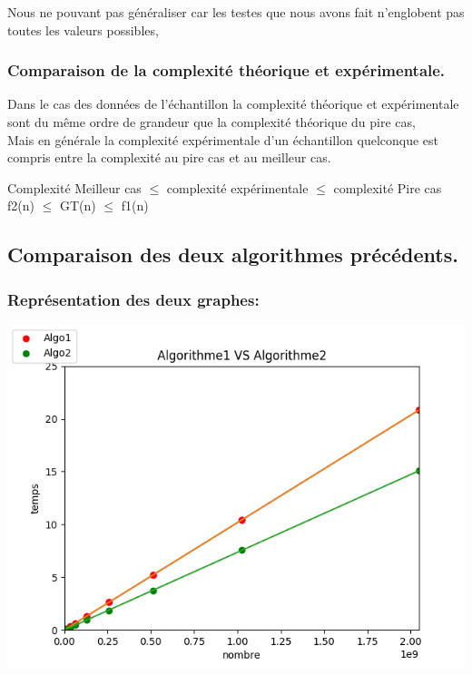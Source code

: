 \documentclass[12pt]{article}
\begin{document}
Nous ne pouvant pas généraliser car les testes que nous avons fait n'englobent pas toutes les valeurs possibles, 
	



\subsubsection{Comparaison de la complexité théorique et expérimentale. }

Dans le cas des données de l'échantillon la complexité théorique et expérimentale sont du même ordre de grandeur que la complexité théorique du pire cas,
\\
Mais en générale la complexité expérimentale d'un échantillon quelconque est compris entre la complexité au pire cas et au meilleur cas.
\\
\begin{center}
\color{blue}
Complexité Meilleur cas $\le$ complexité expérimentale $\le$ complexité Pire cas 
\\
f2(n) $\le$ GT(n) $\le$ f1(n)
\color{black}
\end{center}


\subsection{Comparaison des deux algorithmes précédents.}
\subsubsection{Représentation des deux graphes:}

\includegraphics[width=1\textwidth]{graphe/Algorithme1_VS_Algorithme2.png}
\end{document}
